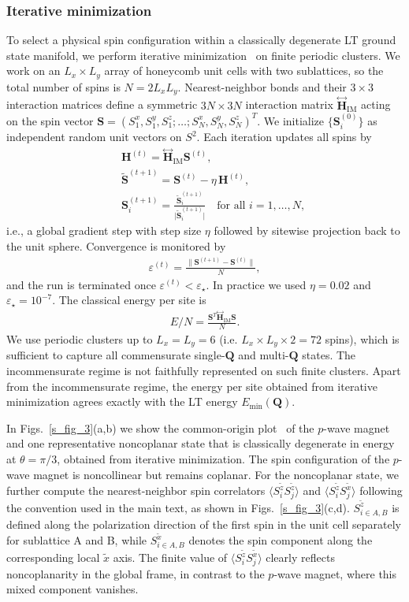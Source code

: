 \documentclass[aps,prl,twocolumn,showpacs,superscriptaddress]{revtex4-2}
\newcommand{\bea}{\begin{eqnarray}}
\newcommand{\eea}{\end{eqnarray}}
\newcommand{\bs}{\boldsymbol}
\begin{document}
\begin{widetext}
\subsubsection{Iterative minimization}
To select a physical spin configuration within a classically degenerate LT ground state manifold, we perform iterative minimization~\cite{sklan2013nonplanar} on finite periodic clusters. We work on an $L_x\times L_y$ array of honeycomb unit cells with two sublattices, so the total number of spins is $N=2L_xL_y$. Nearest-neighbor bonds and their $3\times3$ interaction matrices define a symmetric $3N\times3N$ interaction matrix $\overset{\leftrightarrow}{\bs H}_{\text{IM}}$ acting on the spin vector $\bs S=(S_1^x,S_1^y,S_1^z;\ldots;S_N^x,S_N^y,S_N^z)^T$. We initialize $\{\bs S_i^{(0)}\}$ as independent random unit vectors on $S^2$. Each iteration updates all spins by
\bea
\nonumber
&&\bs H^{(t)}= \overset{\leftrightarrow}{\bs H}_{\text{IM}} \bs S^{(t)},\\
\nonumber
&&\widetilde{\bs S}^{(t+1)} = \bs S^{(t)} - \eta\,\bs H^{(t)},\\
&&\bs S^{(t+1)}_i = \frac{\widetilde{\bs S}^{(t+1)}_i}{\big|\widetilde{\bs S}^{(t+1)}_i\big|} \quad \text{for all } i=1,\dots,N,
\eea
i.e., a global gradient step with step size $\eta$ followed by sitewise projection back to the unit sphere. Convergence is monitored by
\bea
\varepsilon^{(t)}=\frac{\big\|\bs S^{(t+1)}-\bs S^{(t)}\big\|}{N},
\eea
and the run is terminated once $\varepsilon^{(t)}<\varepsilon_\star$. In practice we used $\eta=0.02$ and $\varepsilon_\star=10^{-7}$. The classical energy per site is
\bea
E/N=\frac{\bs S^T \overset{\leftrightarrow}{\bs H}_{\text{IM}} \bs S }{N}.
\eea
We use periodic clusters up to $L_x=L_y=6$ (i.e. $L_x \times L_y \times 2=72$ spins), which is sufficient to capture all commensurate single-$\bs Q$ and multi-$\bs Q$ states. The incommensurate regime is not faithfully represented on such finite clusters. Apart from the incommensurate regime, the energy per site obtained from iterative minimization agrees exactly with the LT energy $E_{\text{min}}(\bs Q)$.

In Figs.~\ref{s_fig_3}(a,b) we show the common-origin plot~\cite{sklan2013nonplanar} of the $p$-wave magnet and one representative noncoplanar state that is classically degenerate in energy at $\theta=\pi/3$, obtained from iterative minimization. The spin configuration of the $p$-wave magnet is noncollinear but remains coplanar. For the noncoplanar state, we further compute the nearest-neighbor spin correlators $\langle S^{\tilde z}_i S^{\tilde z}_j\rangle$ and $\langle S^{\tilde z}_i S^{\tilde x}_j\rangle$ following the convention used in the main text, as shown in Figs.~\ref{s_fig_3}(c,d). $S^{\tilde z}_{i\in A,B}$ is defined along the polarization direction of the first spin in the unit cell separately for sublattice A and B, while $S^{\tilde x}_{i\in A,B}$ denotes the spin component along the corresponding local $\tilde x$ axis. The finite value of $\langle S^{\tilde z}_i S^{\tilde x}_j\rangle$ clearly reflects noncoplanarity in the global frame, in contrast to the $p$-wave magnet, where this mixed component vanishes.


\end{widetext}
\end{document}
